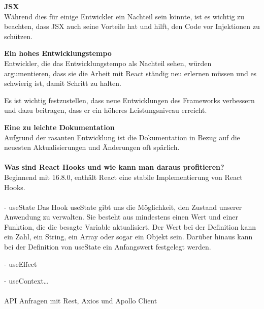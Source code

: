 \textbf{JSX}\\
Während dies für einige Entwickler ein Nachteil sein könnte, ist es wichtig zu beachten, dass JSX auch seine Vorteile hat und hilft, den Code vor Injektionen zu schützen.
\newline

\textbf{Ein hohes Entwicklungstempo}\\
Entwickler, die das Entwicklungstempo als Nachteil sehen, würden argumentieren, dass sie die Arbeit mit React ständig neu erlernen müssen und es schwierig ist, damit Schritt zu halten.

Es ist wichtig festzustellen, dass neue Entwicklungen des Frameworks verbessern und dazu beitragen, dass er ein höheres Leistungsniveau erreicht. 
\newline

\textbf{Eine zu leichte Dokumentation}\\
Aufgrund der rasanten Entwicklung ist die Dokumentation in Bezug auf die neuesten Aktualisierungen und Änderungen oft spärlich. 

\paragraph{}
\textbf{Was sind React Hooks und wie kann man daraus profitieren?}\\
Beginnend mit 16.8.0, enthält React eine stabile Implementierung von React Hooks.



\paragraph{}
- useState
Das Hook useState gibt uns die Möglichkeit, den Zustand unserer Anwendung zu verwalten. Sie besteht aus mindestens einen Wert und einer Funktion, die die besagte Variable aktualisiert.
Der Wert bei der Definition kann ein Zahl, ein String, ein Array oder sogar ein Objekt sein.
Darüber hinaus kann bei der Definition von useState ein Anfangswert festgelegt werden.

- useEffect


- useContext…

\paragraph{}
API Anfragen mit Rest, Axios und Apollo Client

